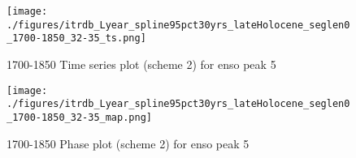 \documentclass[smallextended]{svjour3}       %
\begin{document}
\begin{figure}[!tbp]
\centering
\begin{minipage}[b]{0.45\textwidth}
\texttt{[image: ./figures/itrdb\_Lyear\_spline95pct30yrs\_lateHolocene\_seglen0\_1700-1850\_32-35\_ts.png]}
\caption{1700-1850 Time series plot (scheme 2) for enso peak 5}
\label{ts_5}
\end{minipage}
\hfill
\begin{minipage}[b]{0.45\textwidth}
\texttt{[image: ./figures/itrdb\_Lyear\_spline95pct30yrs\_lateHolocene\_seglen0\_1700-1850\_32-35\_map.png]}
\caption{1700-1850 Phase plot (scheme 2) for enso peak 5}
\label{map_5}
\end{minipage}
\end{figure}
\end{document}
